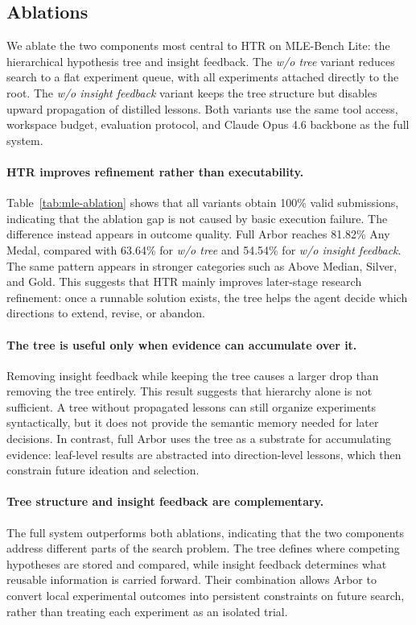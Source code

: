 \documentclass{llmxive}
\begin{document}
\subsection{Ablations}
\label{sec:exp-ablation}

We ablate the two components most central to HTR on MLE-Bench Lite: the hierarchical hypothesis tree and insight feedback. The \textit{w/o tree} variant reduces search to a flat experiment queue, with all experiments attached directly to the root. The \textit{w/o insight feedback} variant keeps the tree structure but disables upward propagation of distilled lessons. Both variants use the same tool access, workspace budget, evaluation protocol, and Claude Opus 4.6 backbone as the full system.

\paragraph{HTR improves refinement rather than executability.}
Table~\ref{tab:mle-ablation} shows that all variants obtain 100\% valid submissions, indicating that the ablation gap is not caused by basic execution failure. The difference instead appears in outcome quality. Full Arbor reaches 81.82\% Any Medal, compared with 63.64\% for \textit{w/o tree} and 54.54\% for \textit{w/o insight feedback}. The same pattern appears in stronger categories such as Above Median, Silver, and Gold. This suggests that HTR mainly improves later-stage research refinement: once a runnable solution exists, the tree helps the agent decide which directions to extend, revise, or abandon.

\paragraph{The tree is useful only when evidence can accumulate over it.}
Removing insight feedback while keeping the tree causes a larger drop than removing the tree entirely. This result suggests that hierarchy alone is not sufficient. A tree without propagated lessons can still organize experiments syntactically, but it does not provide the semantic memory needed for later decisions. In contrast, full Arbor uses the tree as a substrate for accumulating evidence: leaf-level results are abstracted into direction-level lessons, which then constrain future ideation and selection.

\paragraph{Tree structure and insight feedback are complementary.}
The full system outperforms both ablations, indicating that the two components address different parts of the search problem. The tree defines where competing hypotheses are stored and compared, while insight feedback determines what reusable information is carried forward. Their combination allows Arbor to convert local experimental outcomes into persistent constraints on future search, rather than treating each experiment as an isolated trial.
\end{document}
